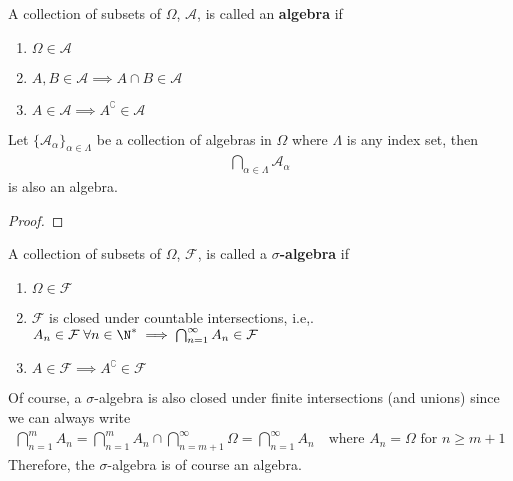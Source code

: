 \documentclass[thmcnt=section, 12pt, color=purple]{my-elegantbook}
\begin{document}

\begin{definition} \label{def:2}
	A collection of subsets of $\Omega$, $\mathcal{A}$,
	is called an \textbf{algebra} if
	\begin{enumerate}
		\item $\Omega \in \mathcal{A}$
		\item $A, B \in \mathcal{A} \implies A \cap B \in \mathcal{A}$
		\item $A \in \mathcal{A} \implies A^\complement \in \mathcal{A}$
	\end{enumerate}
\end{definition}


\begin{proposition} \label{pro:1}
	Let $\{\mathcal{A}_\alpha\}_{\alpha \in \Lambda}$ 
	be a collection of algebras in $\Omega$
	where $\Lambda$ is any index set,
	then 
	\begin{align*}
		\bigcap_{\alpha \in \Lambda} \mathcal{A}_{\alpha}
	\end{align*}
	is also an algebra.
\end{proposition}

\begin{proof}
\end{proof}


\begin{definition} \label{def:3}
	A collection of subsets of $\Omega$, $\mathcal{F}$,
	is called a \textbf{$\sigma$-algebra} if
	\begin{enumerate}
		\item $\Omega \in \mathcal{F}$
		\item $\mathcal{F}$ is closed under countable intersections, 
			i.e,. $A_n \in \mathcal{F} \; \forall n \in \N^\ast \implies \bigcap_{n=1}^\infty A_n \in \mathcal{F}$
		\item $A \in \mathcal{F} \implies A^\complement \in \mathcal{F}$
	\end{enumerate}
\end{definition}

Of course, a $\sigma$-algebra is also closed under finite intersections 
(and unions)
since we can always write
\begin{align*}
	\bigcap_{n=1}^m A_n
	= \bigcap_{n=1}^m A_n \cap \bigcap_{n=m+1}^\infty \Omega
	= \bigcap_{n=1}^\infty A_n
	\quad \text{where $A_n = \Omega$ for $n \geq m+1$}
\end{align*}
Therefore, the $\sigma$-algebra is of course an algebra.
\end{document}
